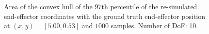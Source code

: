 \documentclass[conference]{IEEEtran}
\begin{document}
\begin{figure}[tbh]
\centering

    \caption{Area of the convex hull of the \(97\)th percentile of the re-simulated end-effector coordinates with the ground truth end-effector position at $(x, y) = [5.00, 0.53]$ and $1000$ samples. Number of DoF: 10.}
\end{figure}
\end{document}
